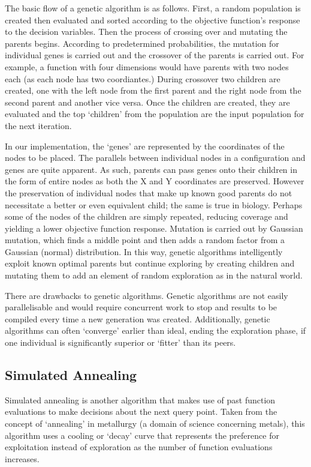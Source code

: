 		The basic flow of a genetic algorithm is as follows. First, a random population is created then evaluated and sorted according to the objective function's response to the decision variables. Then the process of crossing over and mutating the parents begins. According to predetermined probabilities, the  mutation for individual genes is carried out and the crossover of the parents is carried out. For example, a function with four dimensions would have parents with two nodes each (as each node has two coordiantes.) During crossover two children are created, one with the left node from the first parent and the right node from the second parent and another vice versa. Once the children are created, they are evaluated and the top `children' from the population are the input population for the next iteration.

		In our implementation, the `genes' are represented by the coordinates of the nodes to be placed. The parallels between individual nodes in a configuration and genes are quite apparent. As such, parents can pass genes onto their children in the form of entire nodes as both the X and Y coordinates are preserved. However the preservation of individual nodes that make up known good parents do not necessitate a better or even equivalent child; the same is true in biology. Perhaps some of the nodes of the children are simply repeated, reducing coverage and yielding a lower objective function response. Mutation is carried out by Gaussian mutation, which finds a middle point and then adds a random factor from a Gaussian (normal) distribution. In this way, genetic algorithms intelligently exploit known optimal parents but continue exploring by creating children and mutating them to add an element of random exploration as in the natural world.

		There are drawbacks to genetic algorithms. Genetic algorithms are not easily parallelisable and would require concurrent work to stop and results to be compiled every time a new generation was created. Additionally, genetic algorithms can often `converge'\cite{langdon2013foundations} earlier than ideal, ending the exploration phase, if one individual is significantly superior or `fitter' than its peers.

	\subsection{Simulated Annealing} 
		\label{sec:traditional_simulated_annealing} 
		Simulated annealing is another algorithm that makes use of past function evaluations to make decisions about the next query point. Taken from the concept of `annealing' in metallurgy (a domain of science concerning metals), this algorithm uses a cooling or `decay' curve that represents the preference for exploitation instead of exploration as the number of function evaluations increases. 


